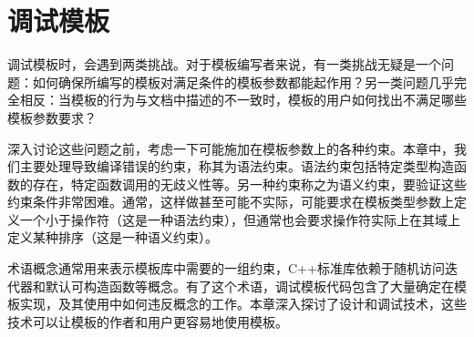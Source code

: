 \chapter{调试模板}
调试模板时，会遇到两类挑战。对于模板编写者来说，有一类挑战无疑是一个问题：如何确保所编写的模板对满足条件的模板参数都能起作用？另一类问题几乎完全相反：当模板的行为与文档中描述的不一致时，模板的用户如何找出不满足哪些模板参数要求？

深入讨论这些问题之前，考虑一下可能施加在模板参数上的各种约束。本章中，我们主要处理导致编译错误的约束，称其为语法约束。语法约束包括特定类型构造函数的存在，特定函数调用的无歧义性等。另一种约束称之为语义约束，要验证这些约束条件非常困难。通常，这样做甚至可能不实际，可能要求在模板类型参数上定义一个小于操作符（这是一种语法约束），但通常也会要求操作符实际上在其域上定义某种排序（这是一种语义约束）。

术语概念通常用来表示模板库中需要的一组约束，C++标准库依赖于随机访问迭代器和默认可构造函数等概念。有了这个术语，调试模板代码包含了大量确定在模板实现，及其使用中如何违反概念的工作。本章深入探讨了设计和调试技术，这些技术可以让模板的作者和用户更容易地使用模板。





